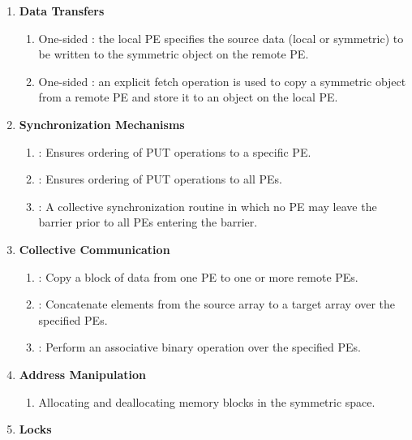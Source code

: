 \begin{enumerate}
\item \textbf{Data Transfers }

\begin{enumerate}
\item One-sided  : the local \ac{PE} specifies the source
data (local or symmetric) to be written to the symmetric object on the remote \ac{PE}. 
\item One-sided  : an explicit fetch operation is used to copy a symmetric object
from a remote \ac{PE} and store it to an object on the local \ac{PE}.\end{enumerate}

\item \textbf{Synchronization Mechanisms }
\begin{enumerate}
\item {}: Ensures ordering of PUT operations to a specific \ac{PE}. 
\item {}: Ensures ordering of PUT operations to all \ac{PE}s. 
\item {}: A collective synchronization routine in which no \ac{PE} may leave
the barrier prior to all \ac{PE}s entering the barrier. 
\end{enumerate}
\item \textbf{Collective Communication}

\begin{enumerate}
\item {}: Copy a block of data from one \ac{PE} to one or more remote
PEs. 
\item {}: Concatenate elements from the source array to a target
array over the specified \ac{PE}s. 
\item {}: Perform an associative binary operation over the specified
\ac{PE}s. 
\end{enumerate}
\item \textbf{Address Manipulation}

\begin{enumerate}
\item Allocating and deallocating memory blocks in the symmetric space.
\end{enumerate}
\item \textbf{Locks}


\end{enumerate}
